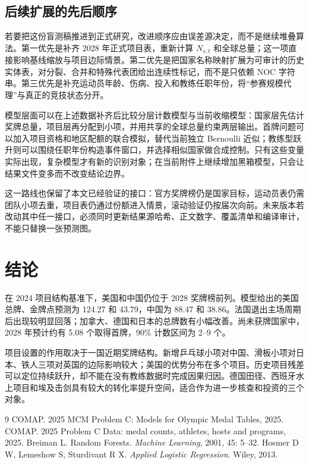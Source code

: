 \documentclass[UTF8,11pt,a4paper]{ctexart}
\begin{document}
\subsection{后续扩展的先后顺序}

若要把这份盲测稿推进到正式研究，改进顺序应由误差源决定，而不是继续堆叠算法。第一优先是补齐 2028 年正式项目表，重新计算 $N_{s,t}$ 和全球总量；这一项直接影响基线缩放与项目边际情景。第二优先是把国家名称映射扩展为可审计的历史实体表，对分裂、合并和特殊代表团给出连续性标记，而不是只依赖 NOC 字符串。第三优先是补充运动员年龄、伤病、投入和教练任职年份，将“参赛规模代理”与真正的竞技状态分开。

模型层面可以在上述数据补齐后比较分层计数模型与当前收缩模型：国家层先估计奖牌总量，项目层再分配到小项，并用共享的全球总量约束两层输出。首牌问题可以加入项目资格和地区配额的联合模拟，替代当前独立 Bernoulli 近似；教练型跃升则可以围绕任职年份构造事件窗口，并选择相似国家做合成控制。只有这些变量实际出现，复杂模型才有新的识别对象；在当前附件上继续增加黑箱模型，只会让结果文件变多而不改变结论边界。

这一路线也保留了本文已经验证的接口：官方奖牌榜仍是国家目标，运动员表仍需团队小项去重，项目表仍通过份额进入情景，滚动验证仍按届次向前。未来版本若改动其中任一接口，必须同时更新结果源哈希、正文数字、覆盖清单和编译审计，不能只替换一张预测图。

\section{结论}

在 2024 项目结构基准下，美国和中国仍位于 2028 奖牌榜前列。模型给出的美国总牌、金牌点预测为 124.27 和 43.79，中国为 88.47 和 38.86。法国退出主场周期后出现较明显回落；加拿大、德国和日本的总牌数有小幅改善。尚未获牌国家中，2028 年预计约有 5.08 个取得首牌，90\% 计数区间为 2--9 个。

项目设置的作用取决于一国近期奖牌结构。新增乒乓球小项对中国、滑板小项对日本、铁人三项对英国的边际影响较大；美国的优势分布在多个项目。历史项目残差可以定位持续跃升，却不能在没有教练数据时完成因果归因。德国田径、西班牙水上项目和埃及击剑具有较大的转化率提升空间，适合作为进一步核查和投资的三个对象。

\label{mcm-body-end}
\begin{thebibliography}{9}
 COMAP. 2025 MCM Problem C: Models for Olympic Medal Tables, 2025.
 COMAP. 2025 Problem C Data: medal counts, athletes, hosts and programs, 2025.
 Breiman L. Random Forests. \emph{Machine Learning}, 2001, 45: 5--32.
 Hosmer D W, Lemeshow S, Sturdivant R X. \emph{Applied Logistic Regression}. Wiley, 2013.
\end{thebibliography}
\end{document}
